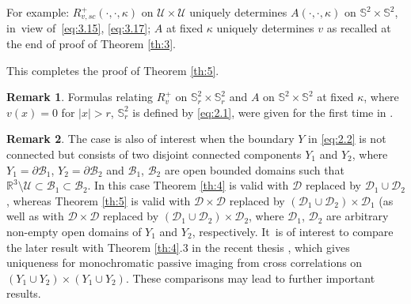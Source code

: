 \documentclass[JEP,XML,SOM,Unicode,NoEqCountersInSection,published]{cedram}
\newcommand{\RR}{\mathbb R}
\theoremstyle{definition}
\newtheorem{remark}{Remark}
\begin{document}
For example: $R_{v,sc}^+(\cdot, \cdot, \kappa)$ on $\mathcal{U} \times \mathcal{U}$ uniquely determines
$A(\cdot, \cdot, \kappa)$ on $\mathbb S^2 \times \mathbb S^2$, in~view of~\eqref{eq:3.15}, \eqref{eq:3.17};
$A$ at fixed $\kappa$ uniquely determines $v$ as recalled at the end of proof of Theorem \ref{th:3}.

This completes the proof of Theorem \ref{th:5}.

\begin{remark}\label{rem:7}
Formulas relating $R_v^+$ on $\mathbb S^2_r \times \mathbb S^2_r$ and $A$ on $\mathbb S^2 \times \mathbb S^2$ at fixed $\kappa$,
where $v(x) = 0$ for $|x|>r$, $\mathbb S^2_r$ is defined by \eqref{eq:2.1}, were given for the first time in \cite{Ber}.
\end{remark}

\begin{remark}\label{rem:8}
The case is also of interest when the boundary $Y$ in \eqref{eq:2.2} is not connected but consists of two disjoint connected components
$Y_1$ and $Y_2$, where $Y_1=\partial \mathcal{B}_1$, $Y_2=\partial \mathcal{B}_2$ and $\mathcal{B}_1$, $\mathcal{B}_2$ are open bounded domains such that $\RR^3 \setminus \mathcal{U} \subset \mathcal{B}_1 \subset \mathcal{B}_2$.
In this case Theorem \ref{th:4} is valid with $\mathcal{D}$ replaced by $\mathcal{D}_1 \cup \mathcal{D}_2$, whereas Theorem \ref{th:5} is valid with $\mathcal{D} \times \mathcal{D}$ replaced by $(\mathcal{D}_1 \cup \mathcal{D}_2) \times \mathcal{D}_1$
(as well as with $\mathcal{D} \times \mathcal{D}$ replaced by $(\mathcal{D}_1 \cup \mathcal{D}_2) \times \mathcal{D}_2$, where $\mathcal{D}_1$, $\mathcal{D}_2$ are arbitrary non-empty open domains of $Y_1$ and $Y_2$, respectively.
It~is of interest to compare the later result with Theorem \ref{th:4}.3 in the recent thesis \cite{Mu}, which gives uniqueness for monochromatic passive imaging from cross correlations on $(Y_1 \cup Y_2) \times (Y_1 \cup Y_2)$.
These comparisons may lead to further important results.
\end{remark}

\backmatter


\end{document}
